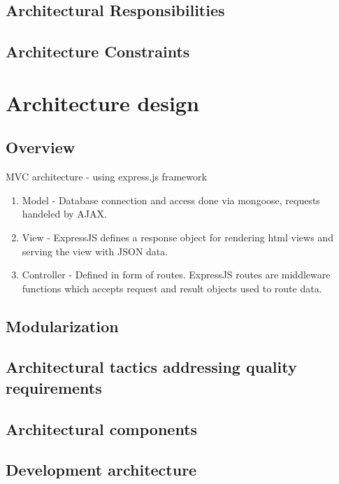 \documentclass[hidelinks, 12pt, oneside]{article}
\begin{document}
\subsection{Architectural Responsibilities}

\subsection{Architecture Constraints}

\section{Architecture design}
\subsection{Overview}
MVC architecture - using express.js framework
\begin {enumerate}
\item Model - Database connection and access done via mongoose, requests handeled by AJAX.
\item View - ExpressJS defines a response object for rendering html views and serving the view with JSON data.
\item Controller - Defined in form of routes. ExpressJS routes  are middleware functions which accepts request and result objects used to route data.
\end {enumerate}
\subsection{Modularization}

\subsection{Architectural tactics addressing quality requirements}

\subsection{Architectural components} 
\subsection{Development architecture} 
\end{document}
